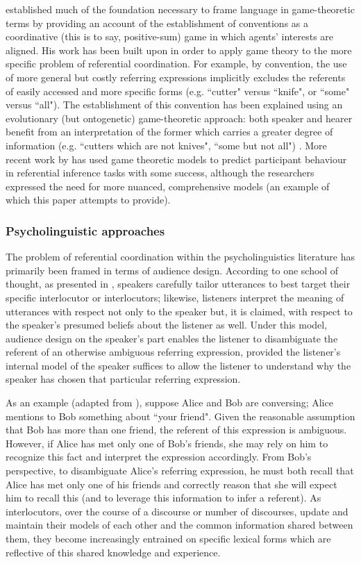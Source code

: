 \documentclass[12pt,a4paper]{article}
\begin{document}
\cite{lewis1969} established much of the foundation necessary to frame language in game-theoretic terms by  providing an account of the establishment of conventions as a coordinative (this is to say, positive-sum) game in which agents' interests are aligned. His work has been built upon in order to apply game theory to the more specific problem of referential coordination. For example, by convention, the use of more general but costly referring expressions implicitly excludes the referents of easily accessed and more specific forms (e.g. ``cutter" versus ``knife", or ``some" versus ``all"). The establishment of this convention has been explained using an evolutionary (but ontogenetic) game-theoretic approach: both speaker and hearer benefit from an interpretation of the former which carries a greater degree of information (e.g. ``cutters which are not knives", ``some but not all") \citep{benz2005}. More recent work by \cite{degen2012} has used game theoretic models to predict participant behaviour in referential inference tasks with some success, although the researchers expressed the need for more nuanced, comprehensive models (an example of which this paper attempts to provide). 

\subsubsection{Psycholinguistic approaches}
The problem of referential coordination within the psycholinguistics literature has primarily been framed in terms of audience design. According to one school of thought, as presented in \cite{clark1982}, speakers carefully tailor utterances to best target their specific interlocutor or interlocutors; likewise, listeners interpret the meaning of utterances with respect not only to the speaker but, it is claimed, with respect to the speaker's presumed beliefs about the listener as well. Under this model, audience design on the speaker's part enables the listener to disambiguate the referent of an otherwise ambiguous referring expression, provided the listener's internal model of the speaker suffices to allow the listener to understand why the speaker has chosen that particular referring expression. 

As an example (adapted from \citeauthor{clark1982}), suppose Alice and Bob are conversing; Alice mentions to Bob something about ``your friend". Given the reasonable assumption that Bob has more than one friend, the referent of this expression is ambiguous. However, if Alice has met only one of Bob's friends, she may rely on him to recognize this fact and interpret the expression accordingly. From Bob's perspective, to disambiguate Alice's referring expression, he must both recall that Alice has met only one of his friends and  correctly reason that she will expect him to recall this (and to leverage this information to infer a referent). As interlocutors, over the course of a discourse or number of discourses, update and maintain their models of each other and the common information shared between them, they become increasingly entrained on specific lexical forms which are reflective of this shared knowledge and experience.
\end{document}
